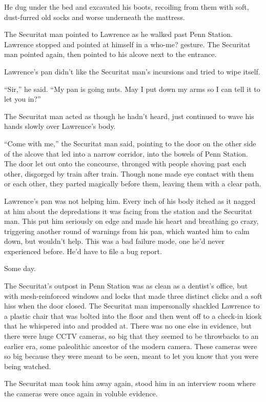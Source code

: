 He dug under the bed and excavated his boots, recoiling from them with 
soft, dust-furred old socks and worse underneath the mattress.

\tb

The Securitat man pointed to Lawrence as he walked past Penn Station. 
Lawrence stopped and pointed at himself in a who-me? gesture. The 
Securitat man pointed again, then pointed to his alcove next to the 
entrance.

Lawrence's pan didn't like the Securitat man's incursions and tried to 
wipe itself.

“Sir,” he said. “My pan is going nuts. May I put down my arms so 
I can tell it to let you in?”

The Securitat man acted as though he hadn't heard, just continued to 
wave his hands slowly over Lawrence's body.

“Come with me,” the Securitat man said, pointing to the door on the 
other side of the alcove that led into a narrow corridor, into the 
bowels of Penn Station. The door let out onto the concourse, thronged 
with people shoving past each other, disgorged by train after train. 
Though none made eye contact with them or each other, they parted 
magically before them, leaving them with a clear path.

Lawrence's pan was not helping him. Every inch of his body itched as it 
nagged at him about the depredations it was facing from the station and 
the Securitat man. This put him seriously on edge and made his heart 
and breathing go crazy, triggering another round of warnings from his 
pan, which wanted him to calm down, but wouldn't help. This was a bad 
failure mode, one he'd never experienced before. He'd have to file a 
bug report.

Some day.

The Securitat's outpost in Penn Station was as clean as a dentist's 
office, but with mesh-reinforced windows and locks that made three 
distinct clicks and a soft hiss when the door closed. The Securitat man 
impersonally shackled Lawrence to a plastic chair that was bolted into 
the floor and then went off to a check-in kiosk that he whispered into 
and prodded at. There was no one else in evidence, but there were huge 
CCTV cameras, so big that they seemed to be throwbacks to an earlier 
era, some paleolithic ancestor of the modern camera. These cameras were 
so big because they were meant to be seen, meant to let you know that 
you were being watched.

The Securitat man took him away again, stood him in an interview room 
where the cameras were once again in voluble evidence.

